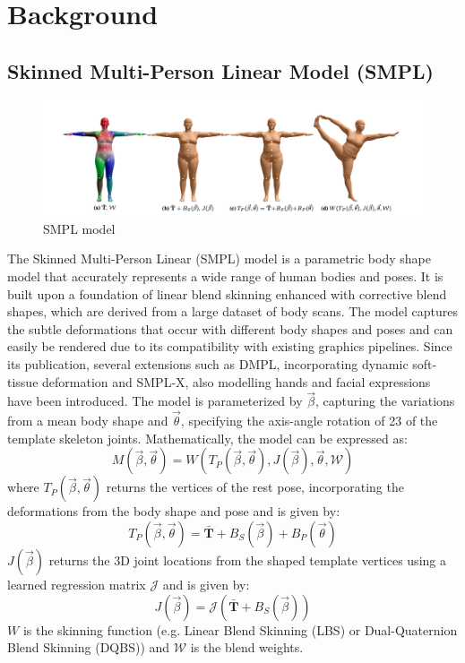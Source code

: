 \chapter{Background} \label{sec:methods}
\section{Skinned Multi-Person Linear Model (SMPL)}
\begin{figure}[h]
    \centering
    \includegraphics[width=\linewidth]{figures/smpl.png}
    \caption{SMPL model}
\end{figure}
The Skinned Multi-Person Linear (SMPL) model is a parametric body shape model that accurately represents a wide range of human bodies and poses. It is built upon a foundation of linear blend skinning enhanced with corrective blend shapes, which are derived from a large dataset of body scans. The model captures the subtle deformations that occur with different body shapes and poses and can easily be rendered due to its compatibility with existing graphics pipelines. Since its publication, several extensions such as DMPL, incorporating dynamic soft-tissue deformation and SMPL-X, also modelling hands and facial expressions have been introduced. The model is parameterized by $\vec{\beta}$, capturing the variations from a mean body shape and $\vec{\theta}$, specifying the axis-angle rotation of 23 of the template skeleton joints. Mathematically, the model can be expressed as:
\begin{equation}
    M(\vec{\beta}, \vec{\theta}) = W(T_P(\vec{\beta}, \vec{\theta}), J(\vec{\beta}), \vec{\theta}, \mathcal{W})
\end{equation}
where $T_P(\vec{\beta}, \vec{\theta})$ returns the vertices of the rest pose, incorporating the deformations from the body shape and pose and is given by:
\begin{equation}
    T_P(\vec{\beta}, \vec{\theta}) = \mathbf{\bar{T}} + B_S(\vec{\beta}) + B_P(\vec{\theta})
\end{equation}
$J(\vec{\beta})$ returns the 3D joint locations from the shaped template vertices using a learned regression matrix $\mathcal{J}$ and is given by:
\begin{equation}
    J(\vec{\beta}) = \mathcal{J}(\mathbf{\bar{T}} + B_S(\vec{\beta}))
\end{equation}
$W$ is the skinning function (e.g. Linear Blend Skinning (LBS) or Dual-Quaternion Blend Skinning (DQBS)) and $\mathcal{W}$ is the blend weights. 

